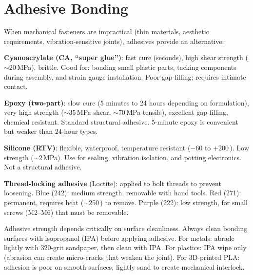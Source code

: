 \section{Adhesive Bonding}
When mechanical fasteners are impractical (thin materials, aesthetic requirements, vibration-sensitive joints), adhesives provide an alternative:

\textbf{Cyanoacrylate (CA, ``super glue'')}: fast cure (seconds), high shear strength ($\sim$20\,MPa), brittle. Good for: bonding small plastic parts, tacking components during assembly, and strain gauge installation. Poor gap-filling; requires intimate contact.

\textbf{Epoxy (two-part)}: slow cure (5 minutes to 24 hours depending on formulation), very high strength ($\sim$35\,MPa shear, $\sim$70\,MPa tensile), excellent gap-filling, chemical resistant. Standard structural adhesive. 5-minute epoxy is convenient but weaker than 24-hour types.

\textbf{Silicone (RTV)}: flexible, waterproof, temperature resistant ($-60$ to $+200$\,\degC{}). Low strength ($\sim$2\,MPa). Use for sealing, vibration isolation, and potting electronics. Not a structural adhesive.

\textbf{Thread-locking adhesive} (Loctite): applied to bolt threads to prevent loosening. Blue (242): medium strength, removable with hand tools. Red (271): permanent, requires heat ($\sim$250\,\degC{}) to remove. Purple (222): low strength, for small screws (M2--M6) that must be removable.

\begin{warningbox}
Adhesive strength depends critically on surface cleanliness. Always clean bonding surfaces with isopropanol (IPA) before applying adhesive. For metals: abrade lightly with 320-grit sandpaper, then clean with IPA. For plastics: IPA wipe only (abrasion can create micro-cracks that weaken the joint). For 3D-printed PLA: adhesion is poor on smooth surfaces; lightly sand to create mechanical interlock.
\end{warningbox}

